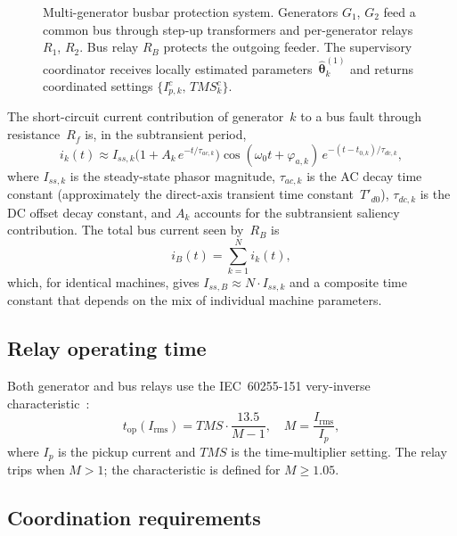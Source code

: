 \documentclass[journal,twoside,letterpaper]{IEEEtran}
\newcommand{\vect}[1]{\bm{#1}}
\newcommand{\est}[1]{\hat{#1}}
\begin{document}
\begin{figure}[!t]
  \centering
  
  \caption{Multi-generator busbar protection system.
    Generators $G_1$, $G_2$ feed a common bus through
    step-up transformers and per-generator relays $R_1$,
    $R_2$.  Bus relay $R_B$ protects the outgoing feeder.
    The supervisory coordinator receives locally estimated
    parameters~$\est{\vect\theta}_k^{(1)}$ and returns
    coordinated settings $\{I_{p,k}^c,\,TMS_k^c\}$.}
  \label{fig:system}
\end{figure}

The short-circuit current contribution of generator~$k$ to a
bus fault through resistance~$R_f$ is, in the subtransient
period,
\begin{equation}
  i_k(t) \approx I_{ss,k}\bigl(1 + A_k\,e^{-t/\tau_{ac,k}}\bigr)
           \cos(\omega_0 t + \varphi_{a,k})\,
           e^{-(t-t_{0,k})/\tau_{dc,k}},
\label{eq:fault_model}
\end{equation}
where $I_{ss,k}$ is the steady-state phasor magnitude,
$\tau_{ac,k}$ is the AC decay time constant (approximately
the direct-axis transient time constant~$T'_{d0}$),
$\tau_{dc,k}$ is the DC offset decay constant, and
$A_k$ accounts for the subtransient saliency contribution.
The total bus current seen by~$R_B$ is
\begin{equation}
  i_B(t) = \sum_{k=1}^{N} i_k(t),
\label{eq:bus_sum}
\end{equation}
which, for identical machines, gives
$I_{ss,B} \approx N \cdot I_{ss,k}$ and a composite time
constant that depends on the mix of individual machine
parameters.

\subsection{Relay operating time}

Both generator and bus relays use the IEC~60255-151
very-inverse characteristic~\cite{IEC60255-151_2009}:
\begin{equation}
  t_{\mathrm{op}}(I_{\mathrm{rms}}) =
    TMS \cdot \frac{13.5}{M - 1},
  \quad M = \frac{I_{\mathrm{rms}}}{I_p},
\label{eq:vi_char}
\end{equation}
where $I_p$ is the pickup current and $TMS$ is the
time-multiplier setting.
The relay trips when $M > 1$; the characteristic is defined
for $M \geq 1.05$.

\subsection{Coordination requirements}
\end{document}
